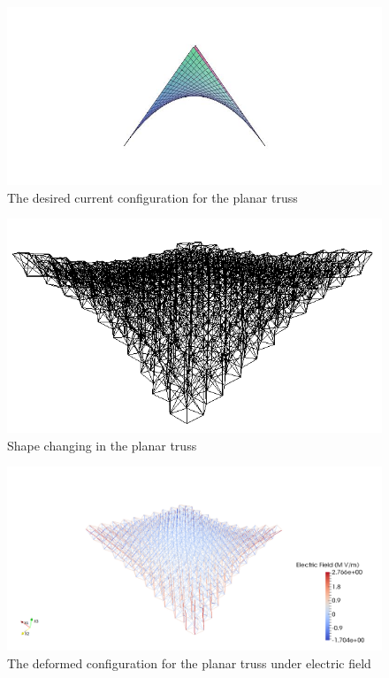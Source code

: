 \begin{figure} 
\centering
\includegraphics[width=5.0in]{./chap_5_active_trusses/images_space_filler/xy_plane_desired_shape.jpg}
\caption{The desired current configuration for the planar truss}
\label{fig:xy_plane_desired_shape}
\end{figure}

\begin{figure} 
\centering
\includegraphics[width=4.5in]{./chap_5_active_trusses/images_space_filler/planar_truss_deformed_config_shape.png}
\caption{Shape changing in the planar truss} 
\label{fig:planar_truss_deformed_config}
\end{figure}


\begin{figure} 
\centering
\includegraphics[width=5.0in]{./chap_5_active_trusses/images_space_filler/planar_truss_deformed_efield_z_eq_xy.png}
\caption{The deformed configuration for the planar truss under electric field} 
\label{fig:planar_truss_deformed_config_efield}
\end{figure}

